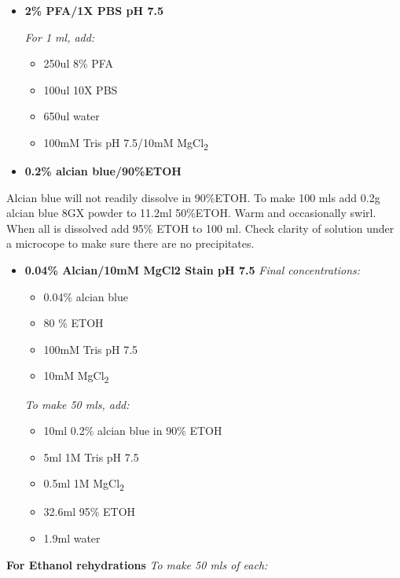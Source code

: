 \documentclass[
  letterpaper,
  DIV=11,
  numbers=noendperiod]{scrreprt}
\providecommand{\tightlist}{%
  \setlength{\itemsep}{0pt}\setlength{\parskip}{0pt}}\usepackage{longtable,booktabs,array}
\begin{document}
\begin{itemize}
\item
  \textbf{2\% PFA/1X PBS pH 7.5}

  \emph{For 1 ml, add:}

  \begin{itemize}
  \tightlist
  \item
    250ul 8\% PFA
  \item
    100ul 10X PBS
  \item
    650ul water
  \item
    100mM Tris pH 7.5/10mM MgCl\textsubscript{2}
  \end{itemize}
\item
  \textbf{0.2\% alcian blue/90\%ETOH}
\end{itemize}

Alcian blue will not readily dissolve in 90\%ETOH. To make 100 mls add
0.2g alcian blue 8GX powder to 11.2ml 50\%ETOH. Warm and occasionally
swirl. When all is dissolved add 95\% ETOH to 100 ml. Check clarity of
solution under a microcope to make sure there are no precipitates.

\begin{itemize}
\item
  \textbf{0.04\% Alcian/10mM MgCl2 Stain pH 7.5} \emph{Final
  concentrations:}

  \begin{itemize}
  \tightlist
  \item
    0.04\% alcian blue
  \item
    80 \% ETOH
  \item
    100mM Tris pH 7.5
  \item
    10mM MgCl\textsubscript{2}
  \end{itemize}

  \emph{To make 50 mls, add:}

  \begin{itemize}
  \tightlist
  \item
    10ml 0.2\% alcian blue in 90\% ETOH
  \item
    5ml 1M Tris pH 7.5
  \item
    0.5ml 1M MgCl\textsubscript{2}
  \item
    32.6ml 95\% ETOH
  \item
    1.9ml water
  \end{itemize}
\end{itemize}

\textbf{For Ethanol rehydrations} \emph{To make 50 mls of each:}
\end{document}
